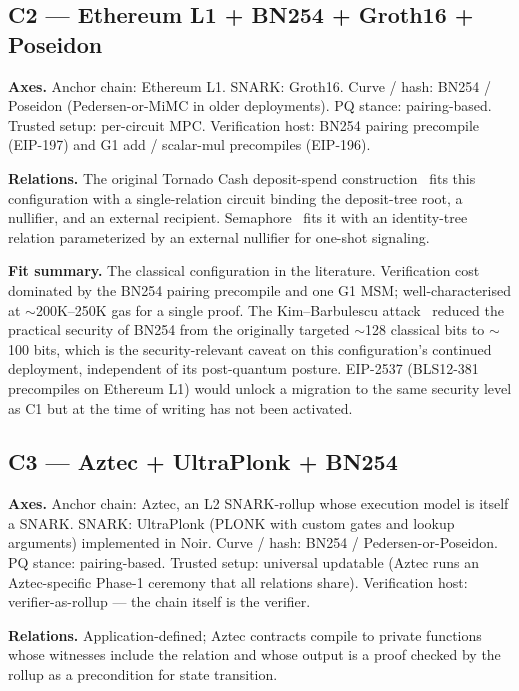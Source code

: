 \subsection{C2 --- Ethereum L1 + BN254 + Groth16 + Poseidon}
\label{sec:cfg-c2}

\textbf{Axes.} Anchor chain: Ethereum L1. SNARK: Groth16.
Curve / hash: BN254 / Poseidon (Pedersen-or-MiMC in older
deployments). PQ stance: pairing-based. Trusted setup: per-circuit
MPC. Verification host: BN254 pairing precompile (EIP-197) and G1
add / scalar-mul precompiles (EIP-196).

\textbf{Relations.} The original Tornado Cash deposit-spend
construction~\cite{pertsev-2019-tornado} fits this configuration with
a single-relation circuit binding the deposit-tree root, a nullifier,
and an external recipient. Semaphore~\cite{semaphore-2024} fits it
with an identity-tree relation parameterized by an external nullifier
for one-shot signaling.

\textbf{Fit summary.} The classical configuration in the literature.
Verification cost dominated by the BN254 pairing precompile and one
G1 MSM; well-characterised at $\sim$200K--250K gas for a single
proof. The
Kim--Barbulescu attack~\cite{kim-barbulescu-2016} reduced the
practical security of BN254 from the originally targeted $\sim$128
classical bits to $\sim$100 bits, which is the security-relevant
caveat on this configuration's continued deployment, independent of
its post-quantum posture. EIP-2537 (BLS12-381 precompiles on Ethereum L1) would
unlock a migration to the same security level as C1 but at the time
of writing has not been activated.

\subsection{C3 --- Aztec + UltraPlonk + BN254}
\label{sec:cfg-c3}

\textbf{Axes.} Anchor chain: Aztec, an L2 SNARK-rollup whose
execution model is itself a SNARK. SNARK: UltraPlonk (PLONK with
custom gates and lookup arguments) implemented in Noir. Curve / hash:
BN254 / Pedersen-or-Poseidon. PQ stance: pairing-based. Trusted
setup: universal updatable (Aztec runs an Aztec-specific Phase-1
ceremony that all relations share). Verification host:
verifier-as-rollup --- the chain itself is the verifier.

\textbf{Relations.} Application-defined; Aztec contracts compile to
private functions whose witnesses include the relation and whose
output is a proof checked by the rollup as a precondition for state
transition.

